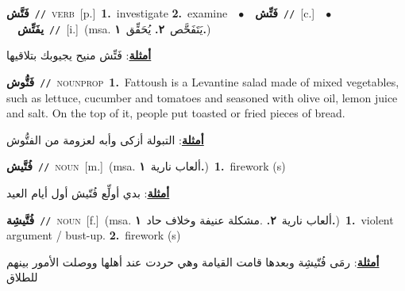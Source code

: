 \documentclass[10pt,a4paper,twoside]{article} %
\begin{document}
\begin{multicols}{2}
{\setlength\topsep{0pt}\textbf{\foreignlanguage{arabic}{فَتَّش}}\ {\color{gray}\texttt{//}\color{black}}\ \textsc{verb}\ [p.]\ \textbf{1.}~investigate  \textbf{2.}~examine\ \ $\bullet$\ \ \setlength\topsep{0pt}\textbf{\foreignlanguage{arabic}{فَتِّش}}\ {\color{gray}\texttt{//}\color{black}}\ [c.]\ \ $\bullet$\ \ \setlength\topsep{0pt}\textbf{\foreignlanguage{arabic}{يفَتِّش}}\ {\color{gray}\texttt{//}\color{black}}\ [i.]\ \color{gray}(msa. \foreignlanguage{arabic}{يَتَفَحَّص}~\foreignlanguage{arabic}{\textbf{٢.}}  \foreignlanguage{arabic}{يُحَقِّق}~\foreignlanguage{arabic}{\textbf{١.}})\color{black}\  \begin{flushright}\color{gray}\foreignlanguage{arabic}{\textbf{\underline{\foreignlanguage{arabic}{أمثلة}}}: فَتِّش منيح يجيوبك بتلاقيها}\end{flushright}\color{black}} \vspace{2mm}

{\setlength\topsep{0pt}\textbf{\foreignlanguage{arabic}{فَتُّوش}}\ {\color{gray}\texttt{//}\color{black}}\ \textsc{noun\textunderscore prop}\ \textbf{1.}~Fattoush is a Levantine salad made of mixed  vegetables, such as lettuce, cucumber and tomatoes and seasoned with olive oil, lemon juice and salt. On the top of it, people put toasted or fried pieces of bread.\  \begin{flushright}\color{gray}\foreignlanguage{arabic}{\textbf{\underline{\foreignlanguage{arabic}{أمثلة}}}: التبولة أزكى وأبه لعزومة من الفتُّوش}\end{flushright}\color{black}} \vspace{2mm}

{\setlength\topsep{0pt}\textbf{\foreignlanguage{arabic}{فُتَّيش}}\ {\color{gray}\texttt{//}\color{black}}\ \textsc{noun}\ [m.]\ \color{gray}(msa. \foreignlanguage{arabic}{ألعاب نارية}~\foreignlanguage{arabic}{\textbf{١.}})\color{black}\ \textbf{1.}~firework (s)\  \begin{flushright}\color{gray}\foreignlanguage{arabic}{\textbf{\underline{\foreignlanguage{arabic}{أمثلة}}}: بدي أولِّع فُتّيش أول أيام العيد}\end{flushright}\color{black}} \vspace{2mm}

{\setlength\topsep{0pt}\textbf{\foreignlanguage{arabic}{فُتَّيشِة}}\ {\color{gray}\texttt{//}\color{black}}\ \textsc{noun}\ [f.]\ \color{gray}(msa. \foreignlanguage{arabic}{ألعاب نارية}~\foreignlanguage{arabic}{\textbf{٢.}}  .\foreignlanguage{arabic}{مشكلة عنيفة وخلاف حاد}~\foreignlanguage{arabic}{\textbf{١.}})\color{black}\ \textbf{1.}~violent argument / bust-up.  \textbf{2.}~firework (s)\  \begin{flushright}\color{gray}\foreignlanguage{arabic}{\textbf{\underline{\foreignlanguage{arabic}{أمثلة}}}: رمَى فُتّيشِة وبعدها قامت القيامة وهي حردت عند أهلها ووصلت الأمور بينهم للطلاق}\end{flushright}\color{black}} \vspace{2mm}


\end{multicols}
\end{document}
